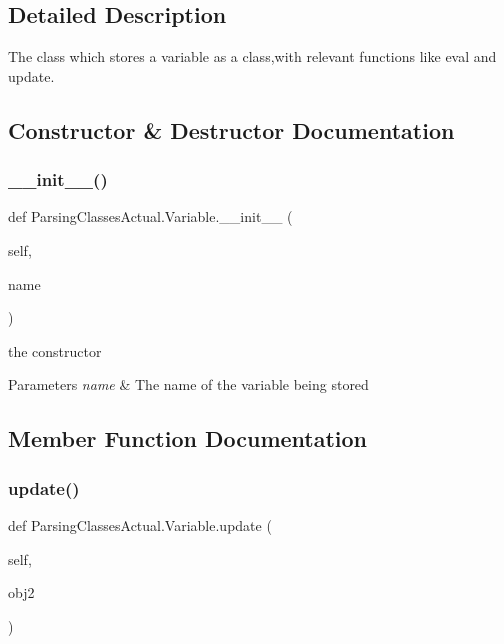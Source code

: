 \subsection{Detailed Description}
The class which stores a variable as a class,with relevant functions like eval and update. 

\subsection{Constructor \& Destructor Documentation}
\mbox{\label{class_parsing_classes_actual_1_1_variable_a1e45d0c6cdb70b7f36a432914a530364}} 
\subsubsection{\texorpdfstring{\+\_\+\+\_\+init\+\_\+\+\_\+()}{\_\_init\_\_()}}
{\footnotesize\ttfamily def Parsing\+Classes\+Actual.\+Variable.\+\_\+\+\_\+init\+\_\+\+\_\+ (\begin{DoxyParamCaption}\item[{}]{self,  }\item[{}]{name }\end{DoxyParamCaption})}



the constructor 


\begin{DoxyParams}{Parameters}
{\em name} & The name of the variable being stored \\
\hline
\end{DoxyParams}


\subsection{Member Function Documentation}
\mbox{\label{class_parsing_classes_actual_1_1_variable_ac3a39c7351d2b51b097903733af3f7ec}} 
\subsubsection{\texorpdfstring{update()}{update()}}
{\footnotesize\ttfamily def Parsing\+Classes\+Actual.\+Variable.\+update (\begin{DoxyParamCaption}\item[{}]{self,  }\item[{}]{obj2 }\end{DoxyParamCaption})}



